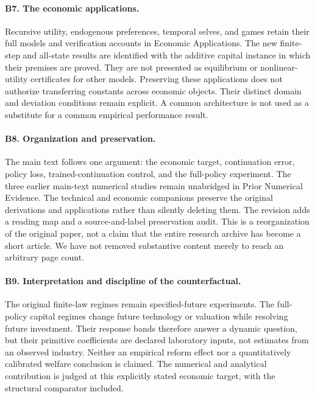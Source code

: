 \paragraph{B7. The economic applications.}
Recursive utility, endogenous preferences, temporal selves, and games retain
their full models and verification accounts in Economic Applications. The
new finite-step and all-state results are identified with the additive capital
instance in which their premises are proved. They are not presented as
equilibrium or nonlinear-utility certificates for other models. Preserving
these applications does not authorize transferring constants across economic
objects. Their distinct domain and deviation conditions remain explicit.
A common architecture is not used as a substitute for a common empirical
performance result.

\paragraph{B8. Organization and preservation.}
The main text follows one argument: the economic target, continuation error,
policy loss, trained-continuation control, and the full-policy experiment.
The three earlier main-text numerical studies remain unabridged in Prior
Numerical Evidence. The technical and economic companions preserve the
original derivations and applications rather than silently deleting them.
The revision adds a reading map and a source-and-label preservation audit.
This is a reorganization of the original paper, not a claim that the entire
research archive has become a short article. We have not removed substantive
content merely to reach an arbitrary page count.

\paragraph{B9. Interpretation and discipline of the counterfactual.}
The original finite-law regimes remain specified-future experiments. The
full-policy capital regimes change future technology or valuation while
resolving future investment. Their response bands therefore answer a dynamic
question, but their primitive coefficients are declared laboratory inputs,
not estimates from an observed industry. Neither an empirical reform effect
nor a quantitatively calibrated welfare conclusion is claimed. The numerical
and analytical contribution is judged at this explicitly stated economic
target, with the structural comparator included.

